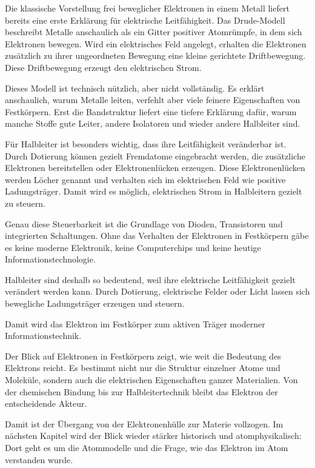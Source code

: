 Die klassische Vorstellung frei beweglicher Elektronen in einem Metall liefert
bereits eine erste Erklärung für elektrische Leitfähigkeit. Das Drude-Modell
 beschreibt Metalle anschaulich als ein Gitter positiver
Atomrümpfe, in dem sich Elektronen bewegen. Wird ein elektrisches Feld
angelegt, erhalten die Elektronen zusätzlich zu ihrer ungeordneten Bewegung
eine kleine gerichtete Driftbewegung. Diese Driftbewegung erzeugt den
elektrischen Strom.

Dieses Modell ist technisch nützlich, aber nicht vollständig. Es erklärt
anschaulich, warum Metalle leiten, verfehlt aber viele feinere Eigenschaften
von Festkörpern. Erst die Bandstruktur liefert eine tiefere Erklärung dafür,
warum manche Stoffe gute Leiter, andere Isolatoren und wieder andere
Halbleiter sind.

Für Halbleiter ist besonders wichtig, dass ihre Leitfähigkeit veränderbar ist.
Durch Dotierung können gezielt Fremdatome eingebracht werden,
die zusätzliche Elektronen bereitstellen oder Elektronenlücken erzeugen. Diese
Elektronenlücken werden Löcher genannt und verhalten sich im
elektrischen Feld wie positive Ladungsträger. Damit wird es möglich,
elektrischen Strom in Halbleitern gezielt zu steuern.

Genau diese Steuerbarkeit ist die Grundlage von Dioden, Transistoren und
integrierten Schaltungen. Ohne das Verhalten der Elektronen in Festkörpern
gäbe es keine moderne Elektronik, keine Computerchips und keine heutige
Informationstechnologie.

\begin{PhysicsBox}
	\label{box:warum-halbleiter-wichtig-sind}
	Halbleiter sind deshalb so bedeutend, weil ihre elektrische Leitfähigkeit
	gezielt verändert werden kann. Durch Dotierung, elektrische Felder oder Licht
	lassen sich bewegliche Ladungsträger erzeugen und steuern.
	
	Damit wird das Elektron im Festkörper zum aktiven Träger moderner
	Informationstechnik.
\end{PhysicsBox}

Der Blick auf Elektronen in Festkörpern zeigt, wie weit die Bedeutung des
Elektrons reicht. Es bestimmt nicht nur die Struktur einzelner Atome und
Moleküle, sondern auch die elektrischen Eigenschaften ganzer Materialien. Von
der chemischen Bindung bis zur Halbleitertechnik bleibt das Elektron der
entscheidende Akteur.

Damit ist der Übergang von der Elektronenhülle zur Materie vollzogen. Im
nächsten Kapitel wird der Blick wieder stärker historisch und atomphysikalisch:
Dort geht es um die Atommodelle und die Frage, wie das Elektron im Atom
verstanden wurde.